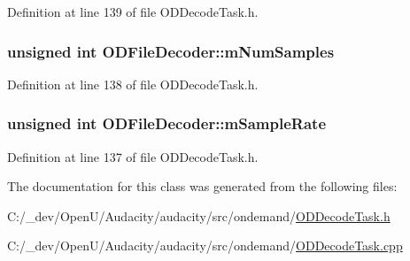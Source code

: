 Definition at line 139 of file O\+D\+Decode\+Task.\+h.

\subsubsection[{\texorpdfstring{m\+Num\+Samples}{mNumSamples}}]{\setlength{\rightskip}{0pt plus 5cm}unsigned {\bf int} O\+D\+File\+Decoder\+::m\+Num\+Samples\hspace{0.3cm}{\ttfamily [protected]}}\hypertarget{class_o_d_file_decoder_a4c0e2d145bf0eb1582bf27abc5dbae8f}{}\label{class_o_d_file_decoder_a4c0e2d145bf0eb1582bf27abc5dbae8f}


Definition at line 138 of file O\+D\+Decode\+Task.\+h.

\subsubsection[{\texorpdfstring{m\+Sample\+Rate}{mSampleRate}}]{\setlength{\rightskip}{0pt plus 5cm}unsigned {\bf int} O\+D\+File\+Decoder\+::m\+Sample\+Rate\hspace{0.3cm}{\ttfamily [protected]}}\hypertarget{class_o_d_file_decoder_a6360e9140219a755c2479ba56780489f}{}\label{class_o_d_file_decoder_a6360e9140219a755c2479ba56780489f}


Definition at line 137 of file O\+D\+Decode\+Task.\+h.



The documentation for this class was generated from the following files\+:\begin{DoxyCompactItemize}
\item 
C\+:/\+\_\+dev/\+Open\+U/\+Audacity/audacity/src/ondemand/\hyperlink{_o_d_decode_task_8h}{O\+D\+Decode\+Task.\+h}\item 
C\+:/\+\_\+dev/\+Open\+U/\+Audacity/audacity/src/ondemand/\hyperlink{_o_d_decode_task_8cpp}{O\+D\+Decode\+Task.\+cpp}\end{DoxyCompactItemize}
